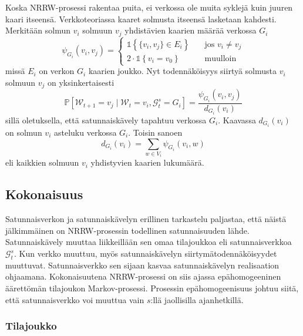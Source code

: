 \documentclass[finnish, 12pt, a4paper, sci, utf8, pdfa]{aaltothesis}
\newcommand{\Grandom}{\mathcal{G}}
\newcommand{\Wrandom}{\mathcal{W}}
\newcommand{\indicator}{\mathopen{\mathds{1}}}
\newcommand*{\prob}{\mathbb{P}}
\begin{document}
Koska NRRW-prosessi rakentaa puita, ei verkossa ole muita syklejä kuin juuren kaari itseensä. Verkkoteoriassa kaaret solmusta itseensä lasketaan kahdesti. Merkitään solmun \( v_{i} \) solmuun \( v_{j} \) yhdistävien kaarien määrää verkossa $ G_{i} $
\[
   \psi_{G_{i}}(v_{i}, v_{j}) = 
      \begin{cases}
         \indicator \left\{ \{ v_{i}, v_{j} \} \in E_{i} \right\} & \quad \text{jos } v_{i} \neq v_{j} \\
         2 \cdot \indicator \left\{ v_{i} = v_{0} \right\}        & \quad \text{muulloin}
      \end{cases}
   \label{equation:psi}
\]
missä \( E_{i} \) on verkon \( G_{i} \) kaarien joukko. Nyt todennäköisyys siirtyä solmusta \( v_{i} \) solmuun \( v_{j} \) on yksinkertaisesti
\begin{equation}
   \prob \left[ \Wrandom_{t+1} = v_{j} \mid \Wrandom_{t} = v_{i}, \Grandom_{t}^{s} = G_{i} \right] = \frac{\psi_{G_{i}}(v_{i}, v_{j})}{d_{G_{i}}(v_{i})}
   \label{equation:verkko-tn}
\end{equation}
sillä oletuksella, että satunnaiskävely tapahtuu verkossa $ G_{i} $. Kaavassa \( d_{G_{i}}(v_{i}) \) on solmun \( v_{i} \) asteluku verkossa $ G_{i} $. Toisin sanoen
\begin{equation}
   d_{G_{i}}(v_{i}) = \sum_{w \in V_{i}} \psi_{G_{i}}(v_{i}, w)
   \label{equation:asteluku}
\end{equation}
eli kaikkien solmuun \( v_{i} \) yhdistyvien kaarien lukumäärä.

\subsection{Kokonaisuus}

Satunnaisverkon ja satunnaiskävelyn erillinen tarkastelu paljastaa, että näistä jälkimmäinen on NRRW-prosessin todellinen satunnaisuuden lähde. Satunnaiskävely muuttaa liikkeillään sen omaa tilajoukkoa eli satunnaisverkkoa \( \Grandom_{t}^{s} \). Kun verkko muuttuu, myös satunnaiskävelyn siirtymätodennäköisyydet muuttuvat. Satunnaisverkko sen sijaan kasvaa satunnaiskävelyn realisaation ohjaamana. Kokonaisuutena NRRW-prosessi on siis ajassa epähomogeeninen äärettömän tilajoukon Markov-prosessi. Prosessin epähomogeenisuus johtuu siitä, että satunnaisverkko voi muuttua vain $ s $:llä jaollisilla ajanhetkillä.

\subsubsection{Tilajoukko}
\end{document}
